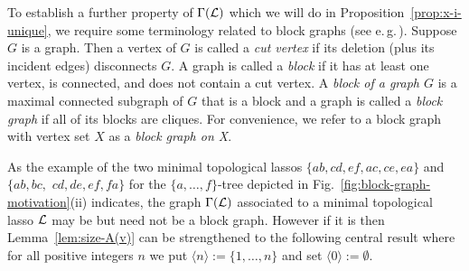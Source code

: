 To establish a further property of $\Gamma({\mathcal L})$ which we will do in
Proposition~\ref{prop:x-i-unique}, we require some terminology related to
block graphs (see e.\,g.\,\cite{diestel}).  Suppose $G$ is a graph. Then a
vertex of $G$ is called a {\em cut vertex} if its deletion (plus its incident
edges) disconnects $G$. A graph is called a {\em block} if it has at least one
vertex, is connected, and does not contain a cut vertex. A {\em block of a
  graph $G$} is a maximal connected subgraph of $G$ that is a block and a
graph is called a {\em block graph} if all of its blocks are cliques. For
convenience, we refer to a block graph with vertex set $X$ as a {\em block
  graph on X}.

As the example of the two minimal topological lassos $
\{ab,cd,ef,ac,ce,ea\}$ and $
\{ab, bc,$ $cd, de, ef, fa\}$ for the $\{a,\ldots,f\}$-tree depicted in
Fig.~\ref{fig:block-graph-motivation}(ii) indicates, the graph $\Gamma({\mathcal L})$
associated to a minimal topological lasso ${\mathcal L}$ may be but need not be a block
graph.  However if it is then Lemma~\ref{lem:size-A(v)} can be strengthened to
the following central result where for all positive integers $n$ we put
$\langle n\rangle :=\{1,\ldots, n\}$ and set $\langle 0\rangle:=\emptyset$.

